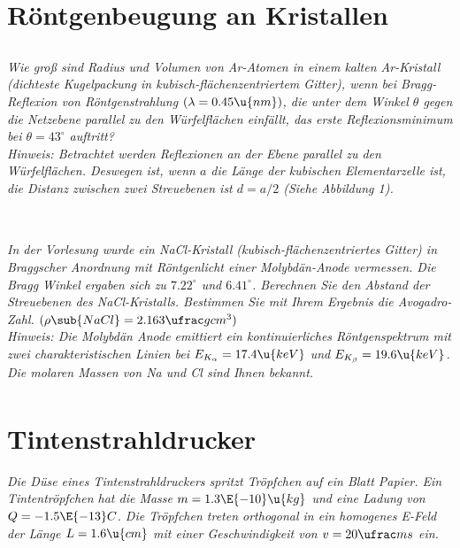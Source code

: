 \documentclass[ex,minted,hatbasis]{exercise_4.0}
\begin{document}
\section{Röntgenbeugung an Kristallen}
\subsection{}
{\it
Wie groß sind Radius und Volumen von {\normalfont Ar}-Atomen in einem kalten {\normalfont Ar}-Kristall (dichteste Kugelpackung in kubisch-flächenzentriertem Gitter), wenn bei Bragg-Reflexion von Röntgenstrahlung $(\lambda = 0.45 \u{nm})$, die unter dem Winkel $\theta$ gegen die Netzebene parallel zu den Würfelflächen einfällt, das erste Reflexionsminimum bei $\theta = 43^\circ$ auftritt?\\[1ex]
\emph{Hinweis:} Betrachtet werden Reflexionen an der Ebene parallel zu den Würfelflächen. Deswegen ist, wenn $a$ die Länge der kubischen Elementarzelle ist, die Distanz zwischen zwei Streuebenen ist $d = a/2$ (Siehe Abbildung 1).}\vspace{2ex}

\begin{align*}
\end{align*}

\subsection{}
\textit{In der Vorlesung wurde ein {\normalfont NaCl}-Kristall (kubisch-flächenzentriertes Gitter) in Braggscher Anordnung mit Röntgenlicht einer Molybdän-Anode vermessen. Die Bragg Winkel ergaben sich zu $7.22^\circ$ und $6.41^\circ$.
Berechnen Sie den Abstand der Streuebenen des {\normalfont NaCl}-Kristalls. Bestimmen Sie mit Ihrem Ergebnis die
Avogadro-Zahl. $(\rho\sub{NaCl} = 2.163 \ufrac g{cm^3})$\\[1ex]
\emph{Hinweis:} Die Molybdän Anode emittiert ein kontinuierliches Röntgenspektrum mit zwei charakteristischen Linien bei $E_{K_\alpha} = 17.4 \u{keV}$ und $E_{K_\beta} = 19.6 \u{keV}$. Die molaren Massen von {\normalfont Na} und {\normalfont Cl} sind Ihnen
bekannt.}\vspace{2ex}
\begin{align*}
\end{align*}

\section{Tintenstrahldrucker}
{\it Die Düse eines Tintenstrahldruckers spritzt Tröpfchen auf ein Blatt Papier. Ein Tintentröpfchen hat die Masse $m = 1.3\E{-10}\u{kg}$ und eine Ladung von $Q = -1.5 \E{-13} C$. Die Tröpfchen treten orthogonal in ein homogenes E-Feld der Länge $L = 1.6 \u{cm}$ mit einer Geschwindigkeit von $v = 20 \ufrac ms$ ein.}
\end{document}
